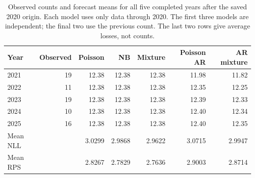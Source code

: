 \begin{table}[htbp]
\centering\small
\caption{Observed counts and forecast means for all five completed years after the saved 2020 origin. Each model uses only data through 2020. The first three models are independent; the final two use the previous count. The last two rows give average losses, not counts.}
\label{tab:extension}
\begin{tabular}{lrrrrrr}
\toprule
Year & Observed & Poisson & NB & Mixture & Poisson AR & AR mixture \\
\midrule
2021 & 19 & 12.38 & 12.38 & 12.38 & 11.98 & 11.82 \\
2022 & 11 & 12.38 & 12.38 & 12.38 & 12.35 & 12.25 \\
2023 & 19 & 12.38 & 12.38 & 12.38 & 12.39 & 12.33 \\
2024 & 10 & 12.38 & 12.38 & 12.38 & 12.40 & 12.34 \\
2025 & 16 & 12.38 & 12.38 & 12.38 & 12.40 & 12.35 \\
\midrule
Mean NLL & & 3.0299 & 2.9868 & 2.9622 & 3.0715 & 2.9947 \\
Mean RPS & & 2.8267 & 2.7829 & 2.7636 & 2.9003 & 2.8714 \\
\bottomrule
\end{tabular}
\end{table}
